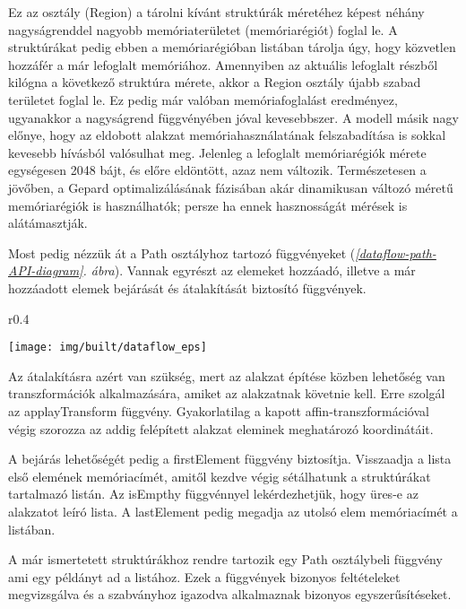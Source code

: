 \documentclass[12pt]{report}
\theoremstyle{definition}
\newcommand{\func}[1]{{\textsf{\footnotesize{#1}}}}
\newcommand{\melyikoldalra}{r}
\begin{document}
Ez az osztály (\func{Region}) a tárolni kívánt struktúrák méretéhez képest
néhány nagyságrenddel nagyobb memóriaterületet (memóriarégiót) foglal le. A
struktúrákat pedig ebben a memóriarégióban listában tárolja úgy, hogy közvetlen
hozzáfér a már lefoglalt memóriához. Amennyiben az aktuális lefoglalt részből
kilógna a következő struktúra mérete, akkor a \func{Region} osztály újabb
szabad területet foglal le. Ez pedig már valóban memóriafoglalást eredményez,
ugyanakkor a nagyságrend függvényében jóval kevesebbszer. A modell másik nagy
előnye, hogy az eldobott alakzat memóriahasználatának felszabadítása is sokkal
kevesebb hívásból valósulhat meg. Jelenleg a lefoglalt memóriarégiók mérete
egységesen 2048 bájt, és előre eldöntött, azaz nem változik. Természetesen a
jövőben, a Gepard optimalizálásának fázisában akár dinamikusan változó méretű
memóriarégiók is használhatók; persze ha ennek hasznosságát mérések is
alátámasztják.

Most pedig nézzük át a \func{Path} osztályhoz tartozó függvényeket
(\emph{\ref{dataflow-path-API-diagram}. ábra}). Vannak egyrészt az elemeket
hozzáadó, illetve a már hozzáadott elemek bejárását és átalakítását biztosító
függvények.

  \begin{wrapfigure}{\melyikoldalra}{0.4\textwidth}
    \begin{center}
      \texttt{[image: img/built/dataflow\_eps]}
    \end{center}
    \caption{\label{dataflow-path-API-diagram} A belső Path API részei}
  \end{wrapfigure}

Az átalakításra azért van szükség, mert az alakzat építése közben lehetőség van
transzformációk alkalmazására, amiket az alakzatnak követnie kell. Erre szolgál
az \func{applayTransform} függvény. Gyakorlatilag a kapott
affin-transzformációval végig szorozza az addig felépített alakzat eleminek
meghatározó koordinátáit.

A bejárás lehetőségét pedig a \func{firstElement} függvény biztosítja.
Visszaadja a lista első elemének memóriacímét, amitől kezdve végig sétálhatunk
a struktúrákat tartalmazó listán. Az \func{isEmpthy} függvénnyel
lekérdezhetjük, hogy üres-e az alakzatot leíró lista. A \func{lastElement}
pedig megadja az utolsó elem memóriacímét a listában.

A már ismertetett struktúrákhoz rendre tartozik egy \func{Path} osztálybeli
függvény ami egy példányt ad a listához. Ezek a függvények bizonyos
feltételeket megvizsgálva és a szabványhoz igazodva alkalmaznak bizonyos
egyszerűsítéseket.
\end{document}
